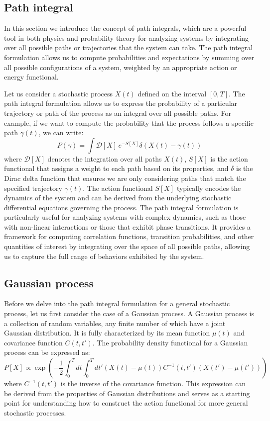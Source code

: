 \documentclass[12pt]{article}
\begin{document}
\begin{singlespace}
\section{Path integral}
In this section we introduce the concept of path integrals, which are a powerful tool in both physics and probability theory for analyzing systems by integrating over all possible paths or trajectories that the system can take. The path integral formulation allows us to compute probabilities and expectations by summing over all possible configurations of a system, weighted by an appropriate action or energy functional.

Let us consider a stochastic process $X(t)$ defined on the interval $[0, T]$. The path integral formulation allows us to express the probability of a particular trajectory or path of the process as an integral over all possible paths. For example, if we want to compute the probability that the process follows a specific path $\gamma(t)$, we can write:
\begin{equation}
P(\gamma) = \int \mathcal{D}[X] \, e^{-S[X]} \delta(X(t) - \gamma(t))
\end{equation}
where $\mathcal{D}[X]$ denotes the integration over all paths $X(t)$, $S[X]$ is the action functional that assigns a weight to each path based on its properties, and $\delta$ is the Dirac delta function that ensures we are only considering paths that match the specified trajectory $\gamma(t)$. The action functional $S[X]$ typically encodes the dynamics of the system and can be derived from the underlying stochastic differential equations governing the process. The path integral formulation is particularly useful for analyzing systems with complex dynamics, such as those with non-linear interactions or those that exhibit phase transitions. It provides a framework for computing correlation functions, transition probabilities, and other quantities of interest by integrating over the space of all possible paths, allowing us to capture the full range of behaviors exhibited by the system.

\subsection{Gaussian process}
Before we delve into the path integral formulation for a general stochastic process, let us first consider the case of a Gaussian process. A Gaussian process is a collection of random variables, any finite number of which have a joint Gaussian distribution. It is fully characterized by its mean function $\mu(t)$ and covariance function $C(t, t')$. The probability density functional for a Gaussian process can be expressed as:
\begin{equation}P[X] \propto \exp\left( -\frac{1}{2} \int_0^T dt \int_0^T dt' (X(t) - \mu(t)) C^{-1}(t, t') (X(t') - \mu(t')) \right)\end{equation}
where $C^{-1}(t, t')$ is the inverse of the covariance function. This expression can be derived from the properties of Gaussian distributions and serves as a starting point for understanding how to construct the action functional for more general stochastic processes.


\end{singlespace}
\end{document}
